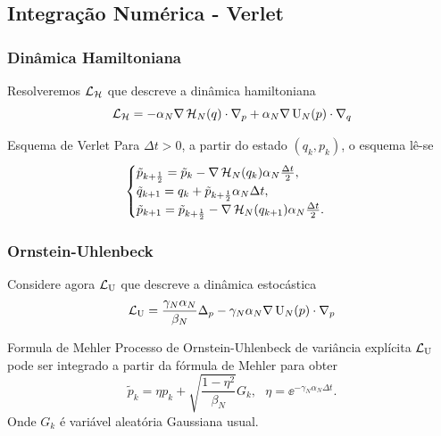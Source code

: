 \subsection{Integração Numérica - Verlet}
\begin{frame}
	\frametitle{Dinâmica Hamiltoniana}
	Resolveremos $\operatorname{\mathcal{L}}_{\operatorname{\mathcal{H}}}$ que descreve a dinâmica hamiltoniana
	\[
	\operatorname{\mathcal{L}}_{\operatorname{\mathcal{H}}} = -\alpha_N \nabla\operatorname{\mathcal{H}}_N(q) \cdot \nabla_p + \alpha_N \nabla \operatorname{U}_N(p) \cdot \nabla_q
	\]
	\begin{block}{Esquema de Verlet}
		Para $\Delta t > 0$, a partir do estado $(q_k, p_k)$, o esquema lê-se
		\[
		\begin{cases}
			\tilde{p}_{k+\frac{1}{2}} = \tilde{p}_k - \nabla \operatorname{\mathcal{H}}_N(q_k) \alpha_N \frac{\Delta t}{2}, \\
			\tilde{q}_{k+1} = q_k + \tilde{p}_{k + \frac{1}{2}} \alpha_N \Delta t, \\
			\tilde{p}_{k+1} = \tilde{p}_{k+\frac{1}{2}} - \nabla \operatorname{\mathcal{H}}_N(q_{k+1}) \alpha_N \frac{\Delta t}{2}.
		\end{cases}
		\]
	\end{block}
\end{frame}
\begin{frame}
	\frametitle{Ornstein-Uhlenbeck}
	Considere agora $\operatorname{\mathcal{L}}_{\operatorname{U}}$ que descreve a dinâmica estocástica
	\[
	\operatorname{\mathcal{L}}_{\operatorname{U}} = \frac{\gamma_N\alpha_N}{\beta_N} \Delta_p - \gamma_N \alpha_N \nabla \operatorname{U}_N(p) \cdot \nabla_p
	\]
	\begin{block}{Formula de Mehler}
		Processo de Ornstein-Uhlenbeck de variância explícita $\operatorname{\mathcal{L}}_{\operatorname{U}}$ pode ser integrado a partir da fórmula de Mehler para obter
		\[
			\tilde{p}_k = \eta p_k + \sqrt{\frac{1-\eta^2}{\beta_N}} G_k, \ \ \ \eta = \ee^{-\gamma_N \alpha_N \Delta t}.
		\]
		Onde $G_k$ é variável aleatória Gaussiana usual.
	\end{block}
\end{frame}

